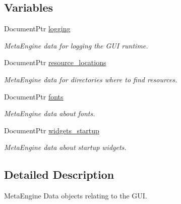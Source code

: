 \subsection*{Variables}
\begin{DoxyCompactItemize}
\item 
Document\+Ptr \hyperlink{namespacesigma_1_1gui_1_1meta_af8a3f5120e5f27ccb51344b13cc72f85}{logging}
\begin{DoxyCompactList}\small\item\em Meta\+Engine data for logging the G\+U\+I runtime. \end{DoxyCompactList}\item 
\hypertarget{namespacesigma_1_1gui_1_1meta_afa0228a29c9906ca87cad3a10bb4722b}{}Document\+Ptr \hyperlink{namespacesigma_1_1gui_1_1meta_afa0228a29c9906ca87cad3a10bb4722b}{resource\+\_\+locations}\label{namespacesigma_1_1gui_1_1meta_afa0228a29c9906ca87cad3a10bb4722b}

\begin{DoxyCompactList}\small\item\em Meta\+Engine data for directories where to find resources. \end{DoxyCompactList}\item 
\hypertarget{namespacesigma_1_1gui_1_1meta_a224cc2f654f02fdbe96fa30bd28b7617}{}Document\+Ptr \hyperlink{namespacesigma_1_1gui_1_1meta_a224cc2f654f02fdbe96fa30bd28b7617}{fonts}\label{namespacesigma_1_1gui_1_1meta_a224cc2f654f02fdbe96fa30bd28b7617}

\begin{DoxyCompactList}\small\item\em Meta\+Engine data about fonts. \end{DoxyCompactList}\item 
\hypertarget{namespacesigma_1_1gui_1_1meta_a94d9d79b72612cd5afbd49a24f699243}{}Document\+Ptr \hyperlink{namespacesigma_1_1gui_1_1meta_a94d9d79b72612cd5afbd49a24f699243}{widgets\+\_\+startup}\label{namespacesigma_1_1gui_1_1meta_a94d9d79b72612cd5afbd49a24f699243}

\begin{DoxyCompactList}\small\item\em Meta\+Engine data about startup widgets. \end{DoxyCompactList}\end{DoxyCompactItemize}


\subsection{Detailed Description}
Meta\+Engine Data objects relating to the G\+U\+I. 

